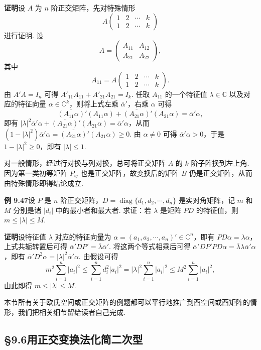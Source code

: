 \documentclass[UTF8, 12pt, fontset=fandol, oneside]{ctexart}
\begin{document}
\noindent\textbf{证明}\quad 设 $A$ 为 $n$ 阶正交矩阵，先对特殊情形
\[
A\begin{pmatrix}
1&2&\cdots&k\\
1&2&\cdots&k
\end{pmatrix}
\]
进行证明. 设
\[
A=\begin{pmatrix}
A_{11}&A_{12}\\
A_{21}&A_{22}
\end{pmatrix},
\]
其中
\[
A_{11}=A\begin{pmatrix}
1&2&\cdots&k\\
1&2&\cdots&k
\end{pmatrix}.
\]
由 $A'A=I_n$ 可得 $A'_{11}A_{11}+A'_{21}A_{21}=I_k$. 任取 $A_{11}$ 的一个特征值 $\lambda\in\mathbb{C}$ 以及对应的特征向量 $\alpha\in\mathbb{C}^k$，则将上式左乘 $\overline{\alpha}'$，右乘 $\alpha$ 可得
\[
\overline{(A_{11}\alpha)}'(A_{11}\alpha)+\overline{(A_{21}\alpha)}'(A_{21}\alpha)=\overline{\alpha}'\alpha,
\]
即有 $|\lambda|^2\overline{\alpha}'\alpha+\overline{(A_{21}\alpha)}'(A_{21}\alpha)=\overline{\alpha}'\alpha$，从而 $(1-|\lambda|^2)\overline{\alpha}'\alpha=\overline{(A_{21}\alpha)}'(A_{21}\alpha)\ge0$. 由 $\alpha\ne0$ 可得 $\overline{\alpha}'\alpha>0$，于是 $1-|\lambda|^2\ge0$，即有 $|\lambda|\le1$.

对一般情形，经过行对换与列对换，总可将正交矩阵 $A$ 的 $k$ 阶子阵换到左上角. 因为第一类初等矩阵 $P_{ij}$ 也是正交矩阵，故变换后的矩阵 $B$ 仍是正交矩阵，从而由特殊情形即得结论成立.

\noindent\textbf{例 9.47}\quad 设 $P$ 是 $n$ 阶正交矩阵，$D=\operatorname{diag}\{d_1,d_2,\cdots,d_n\}$ 是实对角矩阵，记 $m$ 和 $M$ 分别是诸 $|d_i|$ 中的最小者和最大者. 求证：若 $\lambda$ 是矩阵 $PD$ 的特征值，则 $m\le|\lambda|\le M$.

\noindent\textbf{证明}\quad 设特征值 $\lambda$ 对应的特征向量为 $\alpha=(a_1,a_2,\cdots,a_n)'\in\mathbb{C}^n$，即有 $PD\alpha=\lambda\alpha$，上式共轭转置后可得 $\overline{\alpha}'DP'=\overline{\lambda}\overline{\alpha}'$. 将这两个等式相乘后可得 $\overline{\alpha}'DP'PD\alpha=\overline{\lambda}\lambda\overline{\alpha}'\alpha$，即有 $\overline{\alpha}'D^2\alpha=|\lambda|^2\overline{\alpha}'\alpha$. 由假设可得
\[
m^2\sum_{i=1}^n|a_i|^2\le\sum_{i=1}^nd_i^2|a_i|^2=|\lambda|^2\sum_{i=1}^n|a_i|^2\le M^2\sum_{i=1}^n|a_i|^2,
\]
由此即得 $m\le|\lambda|\le M$.

本节所有关于欧氏空间或正交矩阵的例题都可以平行地推广到酉空间或酉矩阵的情形，我们把相关细节留给读者自己完成.

\subsection*{§9.6\quad 用正交变换法化简二次型}
\end{document}
